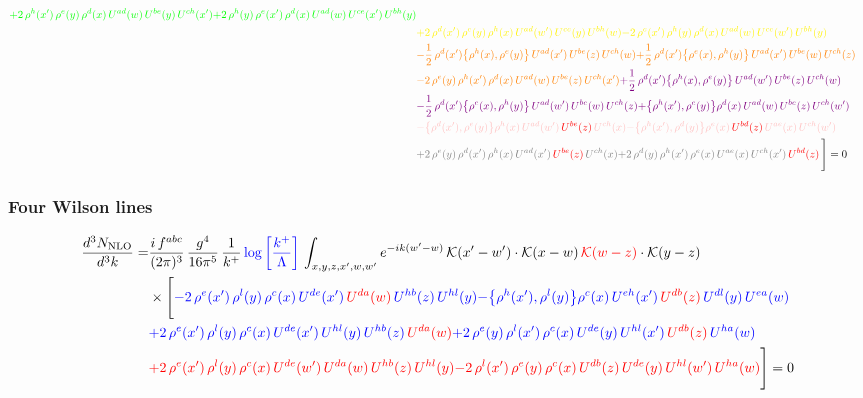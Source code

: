 \documentclass[9pt]{article}
\newcommand{\chg}[1]{{\color{red}#1}}
\numberwithin{equation}{section}
\begin{document}
\begin{align}
{\color{green}+2\,\rho^{h}(x')\,\rho^{e}(y)\,\rho^{d}(x)\,U^{ad}(w)\,U^{be}(y)\,U^{ch}(x')}{\color{green}+2\,\rho^{h}(y)\,\rho^{e}(x')\,\rho^{d}(x)\,U^{ad}(w)\,U^{ce}(x')\,U^{bh}(y)}\notag \\ & {\color{yellow}+2\,\rho^{d}(x')\,\rho^{e}(y)\,\rho^{h}(x)\,U^{ad}(w')\,U^{ce}(y)\,U^{bh}(w)}{\color{yellow}-2\,\rho^{e}(x')\,\rho^{h}(y)\,\rho^{d}(x)\,U^{ad}(w)\,U^{ce}(w')\,U^{bh}(y)}\notag \\ & {\color{orange}-\frac{1}{2}\,\rho^{d}(x')\big\{\rho^{h}(x),\rho^{e}(y)\big\}\,U^{ad}(x')\,U^{be}(z)\,U^{ch}(w)}{\color{orange}+\frac{1}{2}\,\rho^{d}(x')\big\{\rho^{e}(x),\rho^{h}(y)\big\}\,U^{ad}(x')\,U^{be}(w)\,U^{ch}(z)}\notag \\
&{\color{orange}-2\,\rho^{e}(y)\,\rho^{h}(x')\,\rho^{d}(x)\,U^{ad}(w)\,U^{be}(z)\,U^{ch}(x')}{\color{violet}+\frac{1}{2}\,\rho^{d}(x')\big\{\rho^{h}(x),\rho^{e}(y)\big\}\,U^{ad}(w')\,U^{be}(z)\,U^{ch}(w)}\notag \\ & {\color{violet}-\frac{1}{2}\,\rho^{d}(x')\big\{\rho^{e}(x),\rho^{h}(y)\big\}\,U^{ad}(w')\,U^{be}(w)\,U^{ch}(z)}{\color{violet}+\big\{\rho^{h}(x'),\rho^{e}(y)\big\}\rho^{d}(x)\,U^{ad}(w)\,U^{be}(z)\,U^{ch}(w')}\notag \\ &{\color{pink}-\big\{\rho^{d}(x'),\rho^{e}(y)\big\}\rho^{h}(x)\,U^{ad}(w')\,{\color{red}U^{be}(z)}\,U^{ch}(x)}{\color{pink}-\big\{\rho^{h}(x'),\rho^{d}(y)\big\}\rho^{e}(x)\,{\color{red}U^{bd}(z)}\,U^{ae}(x)\,U^{ch}(w')}\notag \\ &{\color{gray}+2\,\rho^{e}(y)\,\rho^{d}(x')\, \rho^{h}(x)\, U^{ad}(x')\,{\color{red}U^{be}(z)}\,U^{ch}(x)}{\color{gray}+2\,\rho^{d}(y)\,\rho^{h}(x')\,\rho^{e}(x)\,U^{ae}(x)\,U^{ch}(x')\,{\color{red}U^{bd}(z)}}\,\Bigg] = 0
\end{align}    
\subsubsection{Four Wilson lines}
\begin{align}
    \frac{d^{3}N_{\rm NLO}}{d^{3}k}= & \frac{i\,f^{abc}}{(2\pi)^{3}}\,\frac{g^{4}}{16\pi^{5}}\,\frac{1}{k^{+}}\,{\color{blue}\log{\left[\frac{k^{+}}{\Lambda}\right]}}\,\int_{x,y,z,x',w,w'}e^{-ik(w'-w)}\,\mathcal{K}(x'-w')\cdot\mathcal{K}(x-w)\,\chg{\mathcal{K}(w-z)}\cdot\mathcal{K}(y-z)\notag \\ & \times\Bigg[{\color{blue}-2\,\rho^{e}(x')\,\rho^{l}(y)\,\rho^{c}(x)\, U^{de}(x')\,{\color{red}U^{da}(w)}\,U^{hb}(z)\,U^{hl}(y)}{\color{blue}-\big\{\rho^{h}(x'),\rho^{l}(y)\big\}\rho^{c}(x)\,U^{eh}(x')\,{\color{red}U^{db}(z)}\,U^{dl}(y)\,U^{ea}(w)}\notag \\ & {\color{blue}+2\,\rho^{e}(x')\,\rho^{l}(y)\, \rho^{c}(x)\, U^{de}(x')\,U^{hl}(y)\,U^{hb}(z)\,{\color{red}U^{da}(w)}} {\color{blue}+2\,\rho^{e}(y)\,\rho^{l}(x')\, \rho^{c}(x)\, U^{de}(y)\,U^{hl}(x')\,{\color{red}U^{db}(z)}\,U^{ha}(w)}\notag \\ & {\color{red}+2\,\rho^{e}(x')\,\rho^{l}(y)\,\rho^{c}(x)\, U^{de}(w')\,{\color{red}U^{da}(w)}\,U^{hb}(z)\,U^{hl}(y)}{\color{red}-2\,\rho^{l}(x')\,\rho^{e}(y)\, \rho^{c}(x)\, {\color{red}U^{db}(z)}\,U^{de}(y)\,U^{hl}(w')\,{\color{red}U^{ha}(w)}}\Bigg] = 0
\end{align}    
\end{document}
